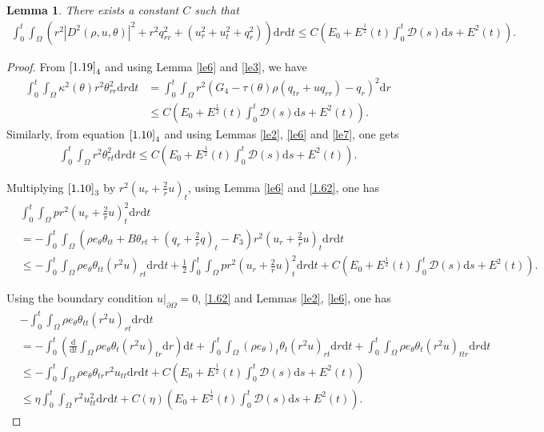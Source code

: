 \documentclass[11pt,reqno]{amsart}
\numberwithin{equation}{section}
\newtheorem{lemma}[theorem]{Lemma}
\newcommand{\dif}{\mathrm{d}}
\newcommand{\intx}{\int_0^t \int_{\Omega} }
\begin{document}
 \begin{lemma}\label{le9}
There exists a constant $C$ such that
\begin{align}\label{1.60}
\intx \left( r^2 | D^2(\rho, u, \theta)|^2+r^2 q_{rr}^2+(u_r^2+u_t^2+q_r^2)\right)\dif r \dif t \le C(E_0+E^\frac{1}{2}(t) \int_0^t  \mathcal D(s)\dif s+E^2(t)).
\end{align}
\end{lemma}
\begin{proof}
From $\eqref{1.19}_4$ and using Lemma \ref{le6} and \ref{le3}, we have
\begin{align}\label{1.61}
\intx \kappa^2(\theta) r^2 \theta_{rr}^2 \dif r \dif t&=\intx r^2(G_4-\tau(\theta) \rho(q_{tr}+uq_{rr})-q_r)^2 \dif r \nonumber\\
& \le C(E_0+E^\frac{1}{2}(t) \int_0^t  \mathcal D(s)\dif s+E^2(t)).
\end{align}
Similarly, from equation $\eqref{1.10}_4$ and using Lemmas \ref{le2}, \ref{le6} and \ref{le7}, one gets
\begin{align}\label{1.62}
\intx r^2 \theta_{rt}^2 \dif r \dif t \le C(E_0+E^\frac{1}{2}(t) \int_0^t  \mathcal D(s)\dif s+E^2(t)).
\end{align}

Multiplying $\eqref{1.10}_3$ by $r^2(u_r+\frac{2}{r} u)_t$, using Lemma \ref{le6} and \eqref{1.62}, one has{\small
\begin{align*}
&\intx p r^2\left(u_r+\frac{2}{r} u\right)_t^2 \dif r\dif t \\
&=-\intx \left( \rho e_\theta \theta_{tt}+B\theta_{rt}+\left(q_r+\frac{2}{r}q\right)_t -F_3\right) r^2 \left(u_r+\frac{2}{r} u\right)_t \dif r \dif t\\
&\le - \intx  \rho e_\theta \theta_{tt}(r^2 u)_{rt} \dif r \dif t+ \frac{1}{2} \intx p r^2 \left(u_r+\frac{2}{r}u\right)_t^2 \dif r \dif t+C(E_0+E^\frac{1}{2}(t) \int_0^t  \mathcal D(s)\dif s+E^2(t)).
\end{align*}}

Using the boundary condition $u|_{\partial \Omega}=0$, \eqref{1.62} and Lemmas \ref{le2}, \ref{le6}, one has
\begin{align*}
&-\intx \rho e_\theta \theta_{tt} (r^2 u)_{rt} \dif r \dif t \\
&=-\int_0^t \left(\frac{\dif}{\dif t} \int_{\Omega} \rho e_\theta \theta_t (r^2 u)_{tr} \dif r \right) \dif t+\intx (\rho e_\theta)_t \theta_t (r^2 u)_{rt} \dif r \dif t +\intx \rho e_\theta \theta_t (r^2 u)_{ttr}\dif r \dif t\\
&\le -\intx \rho e_\theta \theta_{tr} r^2 u_{tt} \dif r \dif t +C(E_0+E^\frac{1}{2}(t) \int_0^t  \mathcal D(s)\dif s+E^2(t))\\
&\le \eta \intx r^2 u_{tt}^2 \dif r\dif t +C(\eta)(E_0+E^\frac{1}{2}(t) \int_0^t  \mathcal D(s)\dif s+E^2(t)).
\end{align*}


\end{proof}
\end{document}
